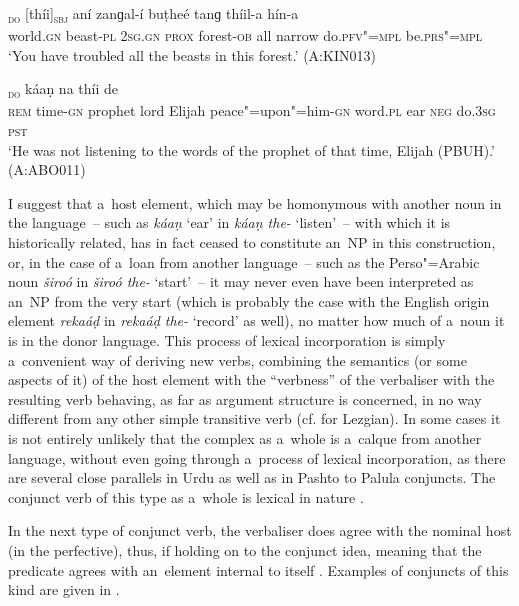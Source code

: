 \begin{exe}
\ex
\label{ex:12-75}
\textsubscript{\textsc{do}} [thíi]\textsubscript{\textsc{sbj}} aní zanɡal-í buṭheé tanɡ thíil-a hín-a \\
world.\textsc{gn} beast-\textsc{pl} \textsc{2sg.gn} \textsc{prox} forest-\textsc{ob} all  narrow do.\textsc{pfv"=mpl} be.\textsc{prs"=mpl} \\
\glt `You have troubled all the beasts in this forest.' (A:KIN013)

\ex
\label{ex:12-76}
\gll [eesé waxt-íi peeɣambár hazrát ilyaás aleehi"=salaam-íi beetí]\textsubscript{\textsc{do}} káaṇ na thíi de \\
\textsc{rem} time-\textsc{gn} prophet lord Elijah peace"=upon"=him-\textsc{gn} word.\textsc{pl} ear \textsc{neg} do.\textsc{3sg} \textsc{pst} \\
\glt `He was not listening to the words of the prophet of that time, Elijah (PBUH).' (A:ABO011)
\end{exe}

I suggest that a~host element, which may be homonymous with another noun in the language~-- such as \textit{káaṇ} `ear' in \textit{káaṇ the-} `listen'~-- with which it is historically related, has in fact ceased to constitute an~NP in this construction, or, in the case of a~loan from another language~-- such as the Perso"=Arabic noun \textit{široó} in \textit{široó the-} `start'~-- it may never even have been interpreted as an~NP from the very start (which is probably the case with the English origin element \textit{rekaáḍ} in \textit{rekaáḍ the-} `record' as well), no matter how much of a~noun it is in the donor language. This process of lexical incorporation \citep[203]{verma1993} is simply a~convenient way of deriving new verbs, combining the semantics (or some aspects of it) of the host element with the ``verbness'' of the verbaliser with the resulting verb behaving, as far as argument structure is concerned, in no way different from any other simple transitive verb (cf. \citealt[286]{haspelmath1993} for Lezgian). In some cases it is not entirely unlikely that the complex as a~whole is a~calque from another language, without even going through a~process of lexical incorporation, as there are several close parallels in Urdu as well as in Pashto to Palula conjuncts. The conjunct verb of this type as a~whole is lexical in nature \citep[199]{verma1993}.



 In the next type of conjunct verb, the verbaliser does agree with the nominal host (in the perfective), thus, if holding on to the conjunct idea, meaning that the predicate agrees with an~element internal to itself \citep[168]{mohanan1993}. Examples of conjuncts of this kind are given in .


